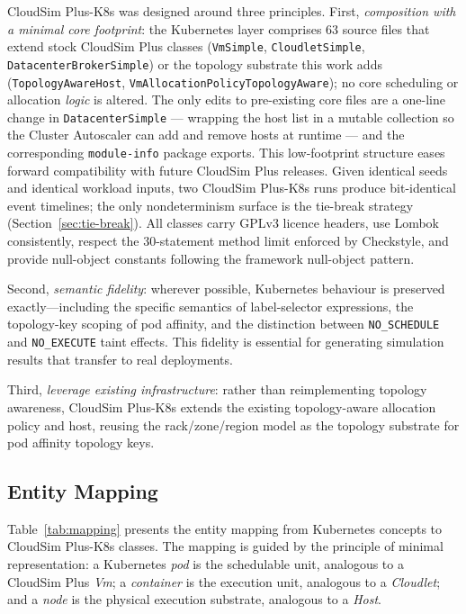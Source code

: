 \documentclass[ASNA,twocolumn]{USG}
\newcommand{\ckm}{CloudSim Plus-K8s\xspace}
\begin{document}
    \ckm was designed around three principles. First,
    \emph{composition with a minimal core footprint}: the Kubernetes
    layer comprises 63 source files that extend stock CloudSim Plus
    classes (\texttt{VmSimple}, \texttt{CloudletSimple},
    \texttt{DatacenterBrokerSimple}) or the topology substrate this work
    adds (\texttt{TopologyAwareHost},
    \texttt{VmAllocationPolicyTopologyAware}); no core scheduling or
    allocation \emph{logic} is altered. The only edits to pre-existing
    core files are a one-line change in \texttt{DatacenterSimple} ---
    wrapping the host list in a mutable collection so the Cluster
    Autoscaler can add and remove hosts at runtime --- and the
    corresponding \texttt{module-info} package exports. This
    low-footprint structure eases forward compatibility with
    future CloudSim Plus releases. Given identical
    seeds and identical workload inputs, two \ckm runs produce
    bit-identical event timelines; the only nondeterminism surface is
    the tie-break strategy (Section~\ref{sec:tie-break}). All classes
    carry GPLv3 licence headers, use Lombok consistently, respect the
    30-statement method limit enforced by Checkstyle, and provide
    null-object constants following the framework null-object pattern.

    Second, \emph{semantic fidelity}: wherever possible, Kubernetes
    behaviour is preserved exactly---including the specific semantics of
    label-selector expressions, the topology-key scoping of pod
    affinity, and the distinction between \texttt{NO\_SCHEDULE} and
    \texttt{NO\_EXECUTE} taint effects. This fidelity is essential for
    generating simulation results that transfer to real deployments.

    Third, \emph{leverage existing infrastructure}: rather than
    reimplementing topology awareness, \ckm extends the existing
    topology-aware allocation policy and host, reusing the
    rack/zone/region model as the topology substrate for pod affinity
    topology keys.

    \subsection{Entity Mapping}

    Table~\ref{tab:mapping} presents the entity mapping from Kubernetes
    concepts to \ckm classes. The mapping is guided by the
    principle of minimal representation: a Kubernetes \emph{pod} is the
    schedulable unit, analogous to a CloudSim Plus \emph{Vm}; a
    \emph{container} is the execution unit, analogous to a
    \emph{Cloudlet}; and a \emph{node} is the physical execution substrate,
    analogous to a \emph{Host}.
\end{document}
